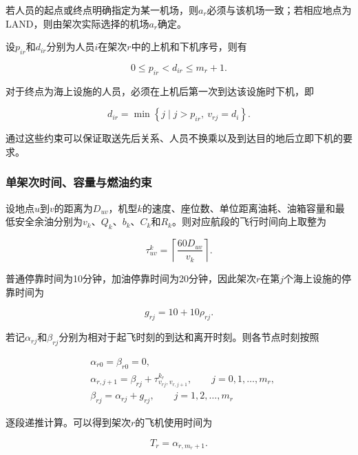\documentclass[UTF-8,a4paper,zihao=-4]{ctexart}
\begin{document}
若人员的起点或终点明确指定为某一机场，则$a_r$必须与该机场一致；若相应地点为LAND，则由架次实际选择的机场$a_r$确定。

设$p_{ir}$和$d_{ir}$分别为人员$i$在架次$r$中的上机和下机序号，则有

\begin{equation}
0\leq p_{ir}<d_{ir}\leq m_r+1.
\end{equation}

对于终点为海上设施的人员，必须在上机后第一次到达该设施时下机，即

\begin{equation}
d_{ir}
=
\min
\left\{
j\mid j>p_{ir},\ v_{rj}=d_i
\right\}.
\end{equation}

通过这些约束可以保证取送先后关系、人员不换乘以及到达目的地后立即下机的要求。

\subsubsection{单架次时间、容量与燃油约束}

设地点$u$到$v$的距离为$D_{uv}$，机型$k$的速度、座位数、单位距离油耗、油箱容量和最低安全余油分别为$v_k$、$Q_k$、$b_k$、$C_k$和$R_k$。则对应航段的飞行时间向上取整为

\begin{equation}
\tau_{uv}^{k}
=
\left\lceil
\frac{60D_{uv}}{v_k}
\right\rceil.
\end{equation}

普通停靠时间为10分钟，加油停靠时间为20分钟，因此架次$r$在第$j$个海上设施的停靠时间为

\begin{equation}
g_{rj}=10+10\rho_{rj}.
\end{equation}

若记$\alpha_{rj}$和$\beta_{rj}$分别为相对于起飞时刻的到达和离开时刻。则各节点时刻按照

\begin{equation}
\begin{aligned}
&\alpha_{r0}=\beta_{r0}=0,\\
&\alpha_{r,j+1}
=
\beta_{rj}
+
\tau_{v_{rj},v_{r,j+1}}^{k_r},
\qquad j=0,1,\ldots,m_r,\\
&\beta_{rj}
=
\alpha_{rj}+g_{rj},
\qquad j=1,2,\ldots,m_r
\end{aligned}
\end{equation}

逐段递推计算。可以得到架次$r$的飞机使用时间为

\begin{equation}
T_r=\alpha_{r,m_r+1}.
\end{equation}
\end{document}
